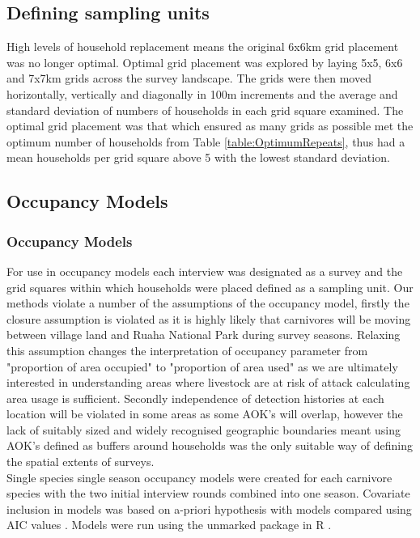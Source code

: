 \subsection{Defining sampling units}
High levels of household replacement means the original 6x6km grid placement was no longer optimal. Optimal grid placement was explored by laying 5x5, 6x6 and 7x7km grids across the survey landscape. The grids were then moved horizontally, vertically and diagonally in 100m increments and the average and standard deviation of numbers of households in each grid square examined. The optimal grid placement was that which ensured as many grids as possible met the optimum number of households from Table \ref{table:OptimumRepeats}, thus had a mean households per grid square above 5 with the lowest standard deviation. 

\subsection{Occupancy Models}

\subsubsection{Occupancy Models}
For use in occupancy models each interview was designated as a survey and the grid squares within which households were placed defined as a sampling unit. Our methods violate a number of the assumptions of the occupancy model, firstly the closure assumption is violated as it is highly likely that carnivores will be moving between village land and Ruaha National Park during survey seasons. Relaxing this assumption changes the interpretation of occupancy parameter from "proportion of area occupied" to "proportion of area used" \cite{MacKenzie2004} as we are ultimately interested in understanding areas where livestock are at risk of attack calculating area usage is sufficient. Secondly independence of detection histories at each location will be violated in some areas as some AOK's will overlap, however the lack of suitably sized and widely recognised geographic boundaries meant using AOK's defined as buffers around households was the only suitable way of defining the spatial extents of surveys.\\

Single species single season occupancy models were created for each carnivore species with the two initial interview rounds combined into one season. Covariate inclusion in models was based on a-priori hypothesis with models compared using AIC values \cite{Burnham2002}. Models were run using the unmarked package \cite{Fiske2011} in R \cite{RCoreTeam2015}.\\

